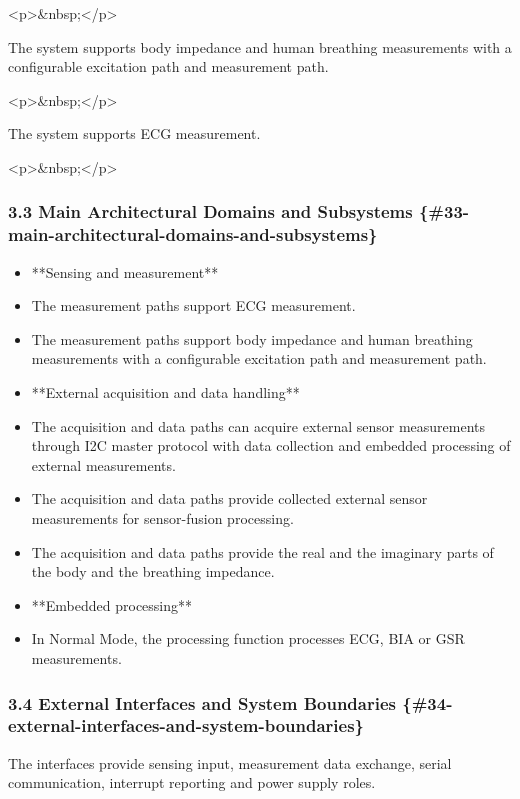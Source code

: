 \documentclass[11pt]{article}
\begin{document}
<p>\&nbsp;</p>

The system supports body impedance and human breathing measurements with a configurable excitation path and measurement path.

<p>\&nbsp;</p>

The system supports ECG measurement.

<p>\&nbsp;</p>

\subsubsection{3.3 Main Architectural Domains and Subsystems \{\#33-main-architectural-domains-and-subsystems\}}


\begin{itemize}
\item **Sensing and measurement**
\item The measurement paths support ECG measurement.
\item The measurement paths support body impedance and human breathing measurements with a configurable excitation path and measurement path.
\item **External acquisition and data handling**
\item The acquisition and data paths can acquire external sensor measurements through I2C master protocol with data collection and embedded processing of external measurements.
\item The acquisition and data paths provide collected external sensor measurements for sensor-fusion processing.
\item The acquisition and data paths provide the real and the imaginary parts of the body and the breathing impedance.
\item **Embedded processing**
\item In Normal Mode, the processing function processes ECG, BIA or GSR measurements.
\end{itemize}

\subsubsection{3.4 External Interfaces and System Boundaries \{\#34-external-interfaces-and-system-boundaries\}}


The interfaces provide sensing input, measurement data exchange, serial communication, interrupt reporting and power supply roles.
\end{document}
